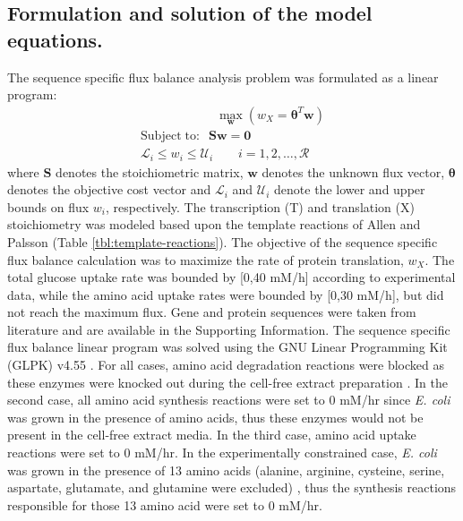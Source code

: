 \documentclass[journal=asbcd6,manuscript=article]{achemso}
\begin{document}
\subsection*{Formulation and solution of the model equations.}
The sequence specific flux balance analysis problem was formulated as a linear program:
\begin{equation}
 \begin{multlined}
	\qquad \qquad \qquad \max_{\boldsymbol{w}}{} \! \left( w_{X} = \mathbf{\boldsymbol{\theta}}^T \boldsymbol{w} \right) \\
	\mathrm{Subject \; to:}
	 \; \; \mathbf{S}\mathbf{w}=\mathbf{0} \\
\mathcal{L}_{i} \leq w_i \leq \mathcal{U}_{i}  \qquad i=1,2,\hdots,\mathcal{R}
 \end{multlined}
\end{equation}
where $\mathbf{S}$ denotes the stoichiometric matrix, $\mathbf{w}$ denotes the unknown flux vector, $\boldsymbol{\theta}$ denotes the objective cost vector
and $\mathcal{L}_{i}$ and $\mathcal{U}_{i}$ denote the lower and upper bounds on flux $w_{i}$, respectively.
The transcription (T) and translation (X) stoichiometry was modeled based upon the template reactions of Allen and Palsson \cite{Allen:2003aa} (Table \ref{tbl:template-reactions}).
The objective of the sequence specific flux balance calculation was to maximize the rate of protein translation, $w_{X}$.
The total glucose uptake rate was bounded by [0,40 mM/h] according to experimental data, while the amino acid uptake rates were bounded by [0,30 mM/h], but did not reach the maximum flux.
Gene and protein sequences were taken from literature and are available in the Supporting Information.
The sequence specific flux balance linear program was solved using the GNU Linear Programming Kit (GLPK) v4.55 \cite{GLPK}.
For all cases, amino acid degradation reactions were blocked as these enzymes were knocked out during the cell-free extract preparation \cite{2005_calhoun_BiotechnologyProgress, Garamella:2016aa}.
In the second case, all amino acid synthesis reactions were set to 0 mM/hr since \textit{E. coli} was grown in the presence of amino acids, thus these enzymes would not be present in the cell-free extract media.
In the third case, amino acid uptake reactions were set to 0 mM/hr.
In the experimentally constrained case, \textit{E. coli} was grown in the presence of 13 amino acids (alanine, arginine, cysteine, serine, aspartate, glutamate, and glutamine were excluded) \cite{Zawada:2003}, thus the synthesis reactions responsible for those 13 amino acid were set to 0 mM/hr.
\end{document}
